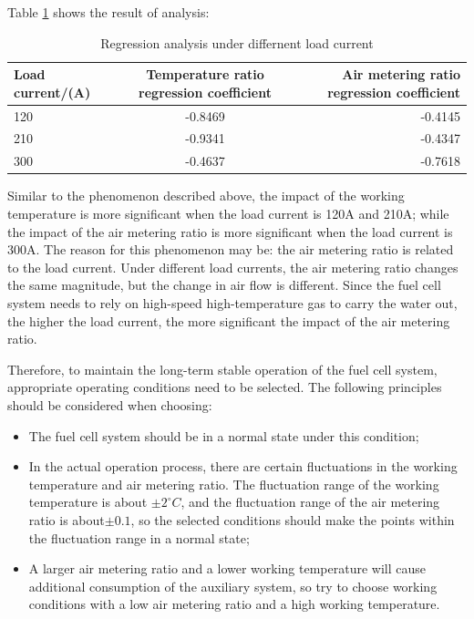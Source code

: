 \par
Table \ref{tab:RegressionAnalysis} shows the result of analysis:
\begin{table}
	\centering
	\begin{center}
		\caption{Regression analysis under differnent load current}
		\label{tab:RegressionAnalysis}
		\begin{tabular}{l||c|r}
			\hline
			\textbf{Load current/(A)} & \textbf{Temperature ratio regression coefficient} & \textbf{Air metering ratio regression coefficient} \\
			\hline
			120                       & -0.8469                                           & -0.4145                                            \\
			210                       & -0.9341                                           & -0.4347                                            \\
			300                       & -0.4637                                           & -0.7618                                            \\
			\hline
		\end{tabular}
	\end{center}
\end{table}
Similar to the phenomenon described above, the impact of the working temperature is more significant when the load current is 120A and 210A; while the impact of the air metering ratio is more significant when the load current is 300A. The reason for this phenomenon may be: the air metering ratio is related to the load current. Under different load currents, the air metering ratio changes the same magnitude, but the change in air flow is different. Since the fuel cell system needs to rely on high-speed high-temperature gas to carry the water out, the higher the load current, the more significant the impact of the air metering ratio.
\par
Therefore, to maintain the long-term stable operation of the fuel cell system, appropriate operating conditions need to be selected. The following principles should be considered when choosing:
\begin{itemize}
	\item The fuel cell system should be in a normal state under this condition;
	\item In the actual operation process, there are certain fluctuations in the working temperature and air metering ratio. The fluctuation range of the working temperature is about $\pm2^{\circ}C$, and the fluctuation range of the air metering ratio is about$\pm0.1$, so the selected conditions should make the points within the fluctuation range in a normal state;
	\item A larger air metering ratio and a lower working temperature will cause additional consumption of the auxiliary system, so try to choose working conditions with a low air metering ratio and a high working temperature.
\end{itemize}
